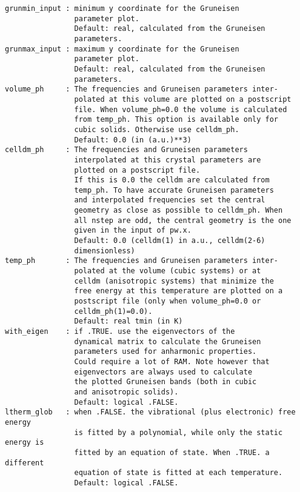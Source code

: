 \documentclass[12pt,a4paper,twoside]{report}
\begin{document}
\begin{verbatim}
grunmin_input : minimum y coordinate for the Gruneisen 
                parameter plot.
                Default: real, calculated from the Gruneisen 
                parameters.
grunmax_input : maximum y coordinate for the Gruneisen 
                parameter plot.
                Default: real, calculated from the Gruneisen 
                parameters.
volume_ph     : The frequencies and Gruneisen parameters inter-
                polated at this volume are plotted on a postscript 
                file. When volume_ph=0.0 the volume is calculated 
                from temp_ph. This option is available only for 
                cubic solids. Otherwise use celldm_ph.
                Default: 0.0 (in (a.u.)**3)
celldm_ph     : The frequencies and Gruneisen parameters 
                interpolated at this crystal parameters are 
                plotted on a postscript file. 
                If this is 0.0 the celldm are calculated from 
                temp_ph. To have accurate Gruneisen parameters 
                and interpolated frequencies set the central 
                geometry as close as possible to celldm_ph. When 
                all nstep are odd, the central geometry is the one 
                given in the input of pw.x.
                Default: 0.0 (celldm(1) in a.u., celldm(2-6) 
                dimensionless)
temp_ph       : The frequencies and Gruneisen parameters inter-
                polated at the volume (cubic systems) or at 
                celldm (anisotropic systems) that minimize the 
                free energy at this temperature are plotted on a 
                postscript file (only when volume_ph=0.0 or 
                celldm_ph(1)=0.0).
                Default: real tmin (in K)
with_eigen    : if .TRUE. use the eigenvectors of the 
                dynamical matrix to calculate the Gruneisen 
                parameters used for anharmonic properties. 
                Could require a lot of RAM. Note however that 
                eigenvectors are always used to calculate
                the plotted Gruneisen bands (both in cubic 
                and anisotropic solids).
                Default: logical .FALSE. 
ltherm_glob   : when .FALSE. the vibrational (plus electronic) free energy
                is fitted by a polynomial, while only the static energy is
                fitted by an equation of state. When .TRUE. a different
                equation of state is fitted at each temperature.
                Default: logical .FALSE.

\end{verbatim}
\end{document}
